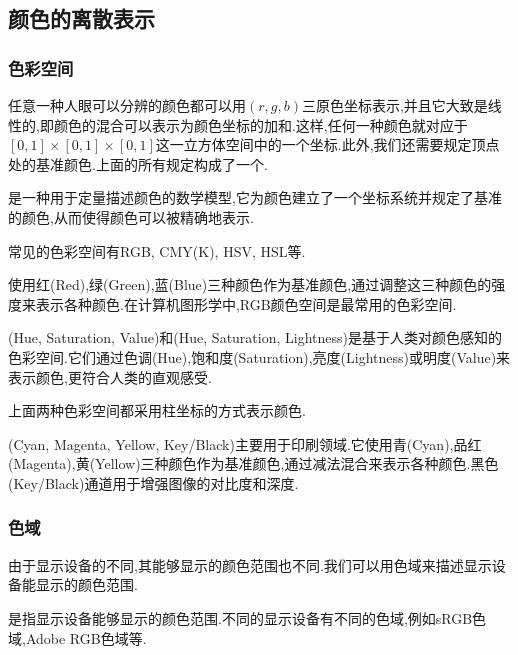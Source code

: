 \documentclass{ctexart}
\begin{document}
\subsection{颜色的离散表示}
\subsubsection{色彩空间}
任意一种人眼可以分辨的颜色都可以用$(r,g,b)$三原色坐标表示,并且它大致是线性的,即颜色的混合可以表示为颜色坐标的加和.这样,任何一种颜色就对应于$[0,1]\times[0,1]\times[0,1]$这一立方体空间中的一个坐标.此外,我们还需要规定顶点处的基准颜色.上面的所有规定构成了一个.
\begin{definition}[色彩空间]
    是一种用于定量描述颜色的数学模型,它为颜色建立了一个坐标系统并规定了基准的颜色,从而使得颜色可以被精确地表示.
\end{definition}
常见的色彩空间有RGB, CMY(K), HSV, HSL等.
\begin{definition}[RGB色彩空间]
    使用红(Red),绿(Green),蓝(Blue)三种颜色作为基准颜色,通过调整这三种颜色的强度来表示各种颜色.在计算机图形学中,RGB颜色空间是最常用的色彩空间.
\end{definition}
\begin{definition}[HSV与HSL色彩空间]
    (Hue, Saturation, Value)和(Hue, Saturation, Lightness)是基于人类对颜色感知的色彩空间.它们通过色调(Hue),饱和度(Saturation),亮度(Lightness)或明度(Value)来表示颜色,更符合人类的直观感受.
\end{definition}
上面两种色彩空间都采用柱坐标的方式表示颜色.
\begin{definition}[CMYK色彩空间]
    (Cyan, Magenta, Yellow, Key/Black)主要用于印刷领域.它使用青(Cyan),品红(Magenta),黄(Yellow)三种颜色作为基准颜色,通过减法混合来表示各种颜色.黑色(Key/Black)通道用于增强图像的对比度和深度.
\end{definition}
\subsubsection{色域}
由于显示设备的不同,其能够显示的颜色范围也不同.我们可以用色域来描述显示设备能显示的颜色范围.
\begin{definition}[色域]
    是指显示设备能够显示的颜色范围.不同的显示设备有不同的色域,例如sRGB色域,Adobe RGB色域等.
\end{definition}
\end{document}
